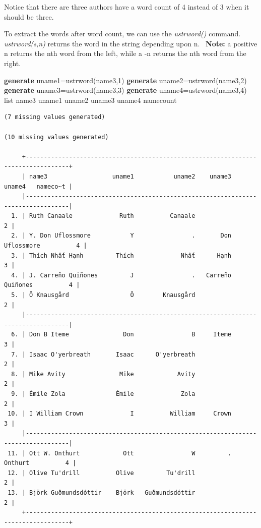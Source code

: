 \documentclass[
]{book}
\newenvironment{Shaded}{\begin{snugshade}}{\end{snugshade}}
\newcommand{\KeywordTok}[1]{\textcolor[rgb]{0.13,0.29,0.53}{\textbf{#1}}}
\newcommand{\NormalTok}[1]{#1}
\newcommand{\OtherTok}[1]{\textcolor[rgb]{0.56,0.35,0.01}{#1}}
\begin{document}
Notice that there are three authors have a word count of 4 instead of 3 when it should be three.

To extract the words after word count, we can use the \emph{ustrword()} command.
\emph{ustrword(s,n)} returns the word in the string depending upon n.~
\textbf{Note:} a positive n returns the nth word from the left, while a -n returns the nth word from the right.

\begin{Shaded}
\begin{Highlighting}[]
    \KeywordTok{generate}\NormalTok{ uname1=ustrword(name3,1)}
    \KeywordTok{generate}\NormalTok{ uname2=ustrword(name3,2)}
    \KeywordTok{generate}\NormalTok{ uname3=ustrword(name3,3)}
    \KeywordTok{generate}\NormalTok{ uname4=ustrword(name3,4)}
    \OtherTok{list}\NormalTok{ name3 uname1 uname2 uname3 uname4 namecount}
\end{Highlighting}
\end{Shaded}

\begin{verbatim}
(7 missing values generated)

(10 missing values generated)

     +----------------------------------------------------------------------------------+
     | name3                  uname1           uname2    uname3       uname4   nameco~t |
     |----------------------------------------------------------------------------------|
  1. | Ruth Canaale             Ruth          Canaale                                 2 |
  2. | Y. Don Uflossmore           Y                .       Don   Uflossmore          4 |
  3. | Thích Nhất Hạnh         Thích             Nhất      Hạnh                       3 |
  4. | J. Carreño Quiñones         J                .   Carreño     Quiñones          4 |
  5. | Ô Knausgård                 Ô        Knausgård                                 2 |
     |----------------------------------------------------------------------------------|
  6. | Don B Iteme               Don                B     Iteme                       3 |
  7. | Isaac O'yerbreath       Isaac      O'yerbreath                                 2 |
  8. | Mike Avity               Mike            Avity                                 2 |
  9. | Émile Zola              Émile             Zola                                 2 |
 10. | I William Crown             I          William     Crown                       3 |
     |----------------------------------------------------------------------------------|
 11. | Ott W. Onthurt            Ott                W         .      Onthurt          4 |
 12. | Olive Tu'drill          Olive         Tu'drill                                 2 |
 13. | Björk Guðmundsdóttir    Björk   Guðmundsdóttir                                 2 |
     +----------------------------------------------------------------------------------+
\end{verbatim}
\end{document}
